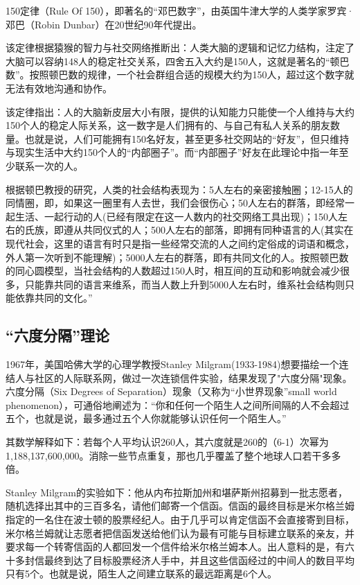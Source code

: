 \documentclass[12pt]{report}
\begin{document}
			150定律（Rule Of 150），即著名的“邓巴数字”，由英国牛津大学的人类学家罗宾·邓巴（Robin Dunbar）在20世纪90年代提出。
			
			该定律根据猿猴的智力与社交网络推断出：人类大脑的逻辑和记忆力结构，注定了大脑可以容纳148人的稳定社交关系，四舍五入大约是150人，这就是著名的“顿巴数”。按照顿巴数的规律，一个社会群组合适的规模大约为150人，超过这个数字就无法有效地沟通和协作。
			
			该定律指出：人的大脑新皮层大小有限，提供的认知能力只能使一个人维持与大约150个人的稳定人际关系，这一数字是人们拥有的、与自己有私人关系的朋友数量。也就是说，人们可能拥有150名好友，甚至更多社交网站的“好友”，但只维持与现实生活中大约150个人的“内部圈子”。而“内部圈子”好友在此理论中指一年至少联系一次的人。
			
			根据顿巴教授的研究，人类的社会结构表现为：5人左右的亲密接触圈；12-15人的同情圈，即，如果这一圈里有人去世，我们会很伤心；50人左右的群落，即经常一起生活、一起行动的人(已经有限定在这一人数内的社交网络工具出现)；150人左右的氏族，即遵从共同仪式的人；500人左右的部落，即拥有同种语言的人(其实在现代社会，这里的语言有时只是指一些经常交流的人之间约定俗成的词语和概念，外人第一次听到不能理解)；5000人左右的群落，即有共同文化的人。按照顿巴数的同心圆模型，当社会结构的人数超过150人时，相互间的互动和影响就会减少很多，只能靠共同的语言来维系，而当人数上升到5000人左右时，维系社会结构则只能依靠共同的文化。”
		
		\subsection{“六度分隔”理论}
		
			1967年，美国哈佛大学的心理学教授Stanley Milgram(1933-1984)想要描绘一个连结人与社区的人际联系网，做过一次连锁信件实验，结果发现了"六度分隔"现象。六度分隔（Six Degrees of Separation）现象（又称为“小世界现象”small world phenomenon），可通俗地阐述为：“你和任何一个陌生人之间所间隔的人不会超过五个，也就是说，最多通过五个人你就能够认识任何一个陌生人。”
			
			其数学解释如下：若每个人平均认识260人，其六度就是260的（6-1）次幂为1,188,137,600,000。消除一些节点重复，那也几乎覆盖了整个地球人口若干多多倍。
			
			Stanley Milgram的实验如下：他从内布拉斯加州和堪萨斯州招募到一批志愿者，随机选择出其中的三百多名，请他们邮寄一个信函。信函的最终目标是米尔格兰姆指定的一名住在波士顿的股票经纪人。由于几乎可以肯定信函不会直接寄到目标，米尔格兰姆就让志愿者把信函发送给他们认为最有可能与目标建立联系的亲友，并要求每一个转寄信函的人都回发一个信件给米尔格兰姆本人。出人意料的是，有六十多封信最终到达了目标股票经济人手中，并且这些信函经过的中间人的数目平均只有5个。也就是说，陌生人之间建立联系的最远距离是6个人。
			
\end{document}
